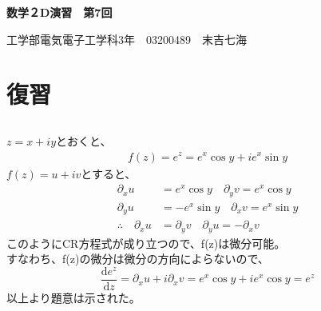 \documentclass[dvipdfmx,a4paper]{jsarticle}
\begin{document}
\begin{center}
\textbf{\huge{数学２D演習　第7回}}
\end{center}

\begin{flushright}
工学部電気電子工学科3年　03200489　末吉七海\\
\end{flushright}

\section{復習}

\subsection{}
$z = x + iy$とおくと、
\begin{align*}
f(z) = e^z = e^x\cos{y} + ie^x\sin{y}
\end{align*}
$f(z) = u + iv$とすると、
\begin{align*}
\partial_x u &=  e^x\cos{y}\quad \partial_y v = e^x\cos{y}\\
\partial_y u &= -e^x\sin{y}\quad \partial_x v = e^x\sin{y}\\
\therefore \quad\partial_x u &= \partial_y v\quad \partial_y u = -\partial_x v
\end{align*}
このようにCR方程式が成り立つので、f(z)は微分可能。\\
 すなわち、f(z)の微分は微分の方向によらないので、
 $$\frac{\mathrm{d}e^z}{\mathrm{d}z} = \partial_x u + i\partial_x v = e^x\cos{y} + ie^x\cos{y} = e^z$$
 以上より題意は示された。\\
 
\end{document}
